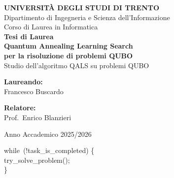 \documentclass[12pt,a4paper,oneside]{report}
\begin{document}
\begin{titlepage}
    \begin{center}
        \vspace*{1cm}

        {\Large \textbf{UNIVERSIT\`A DEGLI STUDI DI TRENTO}}\\[0.4cm]
        {\large Dipartimento di Ingegneria e Scienza dell'Informazione}\\[1.5cm]

        {\large Corso di Laurea in Informatica}\\[2cm]

        {\large \textbf{Tesi di Laurea}}\\[1.8cm]

        {\Huge \textbf{Quantum Annealing Learning Search}}\\[0.4cm]
        {\Large \textbf{per la risoluzione di problemi QUBO}}\\[0.8cm]

        {\large
        Studio dell'algoritmo QALS su problemi QUBO
        }\\[2.5cm]

       \noindent
        \begin{minipage}[t]{0.45\textwidth}
            \vspace{0pt}
            \textbf{Laureando:}\\
            Francesco Buscardo\\
            \end{minipage}
            \hfill
            \begin{minipage}[t]{0.45\textwidth}
            \vspace{0pt}
            \raggedleft
            \textbf{Relatore:}\\
            Prof.\ Enrico Blanzieri
        \end{minipage}
        \vfill

        {\large Anno Accademico 2025/2026}
    \end{center}
\end{titlepage}

\clearpage
\thispagestyle{empty}
\vspace*{\fill}

\begin{center}
\begin{minipage}{0.5\textwidth}
\begin{ttfamily}
\raggedright
while\ (!task\_is\_completed) \{\\
\hspace*{1.5em}try\_solve\_problem();\\
\}
\end{ttfamily}
\end{minipage}
\end{center}
\end{document}
